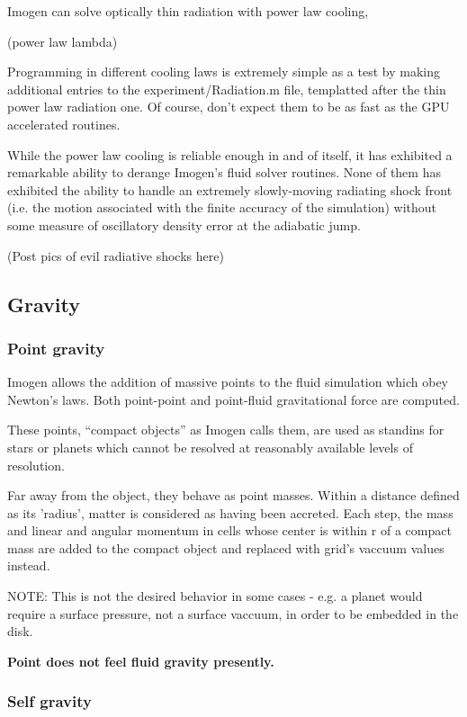 \documentclass[letterpaper,12pt]{article}
\begin{document}
Imogen can solve optically thin radiation with power law cooling,

(power law lambda)

Programming in different cooling laws is extremely simple as a test by making additional
entries to the experiment/Radiation.m file, templatted after the thin power law radiation
one. Of course, don't expect them to be as fast as the GPU accelerated routines.

While the power law cooling is reliable enough in and of itself, it has exhibited a
remarkable ability to derange Imogen's fluid solver routines. None of them has exhibited
the ability to handle an extremely slowly-moving radiating shock front (i.e. the motion
associated with the finite accuracy of the simulation) without some measure of oscillatory
density error at the adiabatic jump.

(Post pics of evil radiative shocks here)

\subsection{Gravity}

\subsubsection{Point gravity}

Imogen allows the addition of massive points to the fluid simulation which obey Newton's
laws. Both point-point and point-fluid gravitational force are computed.

These points, ``compact objects'' as Imogen calls them, are used as standins for stars
or planets which cannot be resolved at reasonably available levels of resolution.

Far away from the object, they behave as point masses. Within a distance defined as
its 'radius', matter is considered as having been accreted. Each step, the mass and
linear and angular momentum in cells whose center is within r of a compact mass
are added to the compact object and replaced with grid's vaccuum values instead.

NOTE: This is not the desired behavior in some cases - e.g. a planet would require a surface
pressure, not a surface vaccuum, in order to be embedded in the disk.

\textbf{Point does not feel fluid gravity presently.}

\subsubsection{Self gravity}
\end{document}
